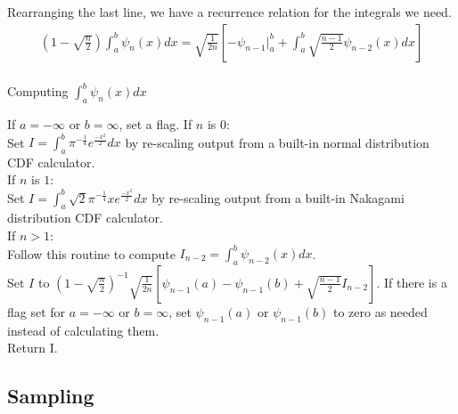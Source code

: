 \documentclass{article}
\begin{document}
Rearranging the last line, we have a recurrence relation for the integrals we need.
\begin{align*}
(1-\sqrt{\frac{n}{2}})\int_a^b \psi_n(x)dx =\sqrt{\frac{1}{2n}} \left[ -\psi_{n-1} \biggr\rvert_a^b + \int_a^b \sqrt{\frac{n-1}{2}}\psi_{n-2}(x)dx\right] \\
\end{align*}

\begin{algorithm}[h]
\caption{Computing $\int_a^b \psi_n(x)dx$}
If $a=-\infty$ or $b=\infty$, set a flag.
If $n$ is $0$:\\
\Indp
Set $I=\int_a^b \pi^{-\frac{1}{4}}e^{\frac{-x^2}{2}} dx$ by re-scaling output from a built-in normal distribution CDF calculator.\\
\Indm
If $n$ is $1$:\\
\Indp
Set $I=\int_a^b \sqrt{2} \pi^{-\frac{1}{4}}xe^{\frac{-x^2}{2}}dx$ by re-scaling output from a built-in Nakagami distribution CDF calculator.\\
\Indm
If $n>1$:\\
\Indp
Follow this routine to compute $I_{n-2}=\int_a^b \psi_{n-2}(x)dx$.\\
Set $I$ to $(1-\sqrt{\frac{n}{2}})^{-1}\sqrt{\frac{1}{2n}} \left[ \psi_{n-1}(a)-\psi_{n-1}(b) + \sqrt{\frac{n-1}{2}}I_{n-2}\right]$. If there is a flag set for $a=-\infty$ or $b=\infty$, set $\psi_{n-1}(a)$ or $\psi_{n-1}(b)$ to zero as needed instead of calculating them.\\
\Indm
Return I.\\
\Indp
\Indm
\end{algorithm}
%
%

\subsection{Sampling}
\end{document}
